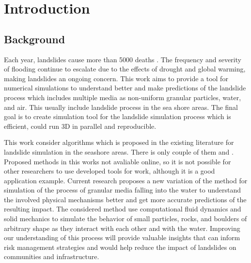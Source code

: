 \chapter{Introduction} \label{chap:intro}

\section{Background}

Each year, landslides cause more than 5000 deaths \cite{perkins2012death}. The frequency and severity of flooding continue to escalate due to the effects of drought and global warming, making landslides an ongoing concern. This work aims to provide a tool for numerical simulations to understand better and make predictions of the landslide process which includes multiple media as non-uniform granular particles, water, and air. This usually include landslide process in the sea shore areas. The final goal is to create simulation tool for the landslide simulation process which is efficient, could run 3D in parallel and reproducible. 

This work consider algorithms which is proposed in the existing literature for landslide simulation in the seashore areas. There is only couple of them \cite{nan2023high} and \cite{shen2022resolved}. Proposed methods in this works not avaliable online, so it is not possible for other researchers to use developed tools for work, although it is a good application example. Current research proposes a new variation of the method for simulation of the process of granular media falling into the water to understand the involved physical mechanisms better and get more accurate predictions of the resulting impact. The considered method use computational fluid dynamics and solid mechanics to simulate the behavior of small particles, rocks, and boulders of arbitrary shape as they interact with each other and with the water. Improving our understanding of this process will provide valuable insights that can inform risk management strategies and would help reduce the impact of landslides on communities and infrastructure.

